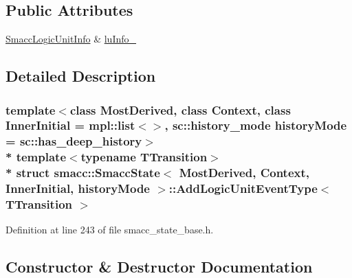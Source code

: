 \subsection*{Public Attributes}
\begin{DoxyCompactItemize}
\item 
\hyperlink{structsmacc_1_1introspection_1_1SmaccLogicUnitInfo}{Smacc\+Logic\+Unit\+Info} \& \hyperlink{structsmacc_1_1SmaccState_1_1AddLogicUnitEventType_a31c27ea945cd0127080c0bae872c028e}{lu\+Info\+\_\+}
\end{DoxyCompactItemize}


\subsection{Detailed Description}
\subsubsection*{template$<$class Most\+Derived, class Context, class Inner\+Initial = mpl\+::list$<$$>$, sc\+::history\+\_\+mode history\+Mode = sc\+::has\+\_\+deep\+\_\+history$>$\\*
template$<$typename T\+Transition$>$\\*
struct smacc\+::\+Smacc\+State$<$ Most\+Derived, Context, Inner\+Initial, history\+Mode $>$\+::\+Add\+Logic\+Unit\+Event\+Type$<$ T\+Transition $>$}



Definition at line 243 of file smacc\+\_\+state\+\_\+base.\+h.



\subsection{Constructor \& Destructor Documentation}
